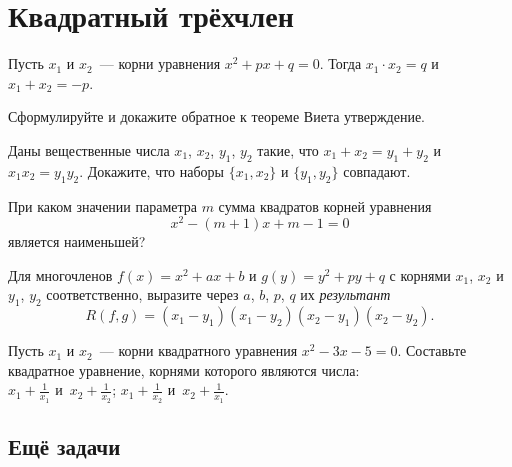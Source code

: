 

\section*{Квадратный трёхчлен}


Пусть $x_1$ и $x_2$~--- корни уравнения $x^2 + p x + q = 0$.
Тогда $x_1 \cdot x_2 = q$ и $x_1 + x_2 = -p$.

\begin{problems}

Сформулируйте и докажите обратное к теореме Виета утверждение.

\item
Даны вещественные числа $x_1$, $x_2$, $y_1$, $y_2$ такие, что
$x_1 + x_2 = y_1 + y_2$ и $x_1 x_2 = y_1 y_2$.
Докажите, что наборы $\{x_1, x_2\}$ и $\{y_1, y_2\}$ совпадают.

\item
При каком значении параметра $m$ сумма квадратов корней уравнения
\[
    x^2 - (m + 1) x + m - 1
=
    0
\]
является наименьшей?

\item
Для многочленов $f(x) = x^2 + a x + b$ и $g(y) = y^2 + p y + q$ с корнями
$x_1$, $x_2$ и $y_1$, $y_2$ соответственно, выразите через $a$, $b$, $p$, $q$
их \emph{результант}
\[
    R(f, g) = (x_1 - y_1) (x_1 - y_2) (x_2 - y_1) (x_2 - y_2)
.\]

\item
Пусть $x_1$ и $x_2$~--- корни квадратного уравнения $x^2 - 3 x - 5 = 0$.
Составьте квадратное уравнение, корнями которого являются числа:
\\
\sbp
$x_1 + \frac{1}{x_1}$ и~$x_2 + \frac{1}{x_2}$;
\qquad
\sbp
$x_1 + \frac{1}{x_2}$ и~$x_2 + \frac{1}{x_1}$.

\end{problems}


\subsection*{Ещё задачи}


